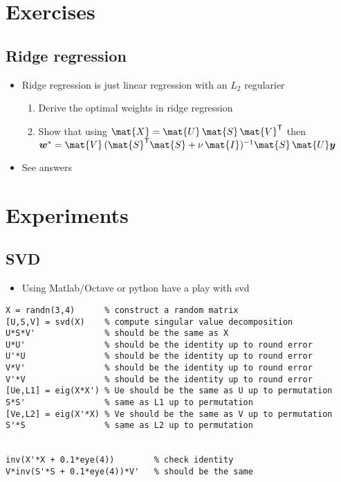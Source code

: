 \documentclass[11pt]{article}
\newcommand{\tr}{\textsf{T}}
\begin{document}
\section{Exercises}
\label{sec:org22787a9}

\subsection{Ridge regression}
\label{sec:org1ad7f4b}
\begin{itemize}
\item Ridge regression is just linear regression with an \(L_2\) regularier
\begin{enumerate}
\item Derive the optimal weights in ridge regression
\item Show that using \(\mat{X} = \mat{U}\,\mat{S}\,\mat{V}^\tr\) then
\(\bm{w}^* = \mat{V}\,(\mat{S}^\tr\mat{S} +
        \nu\,\mat{I})^{-1}\mat{S}\,\mat{U}\bm{y}\)
\end{enumerate}
\item See answers
\end{itemize}

\section{Experiments}
\label{sec:org82fd4ba}

\subsection{SVD}
\label{sec:org086fe6f}
\begin{itemize}
\item Using Matlab/Octave or python have a play with svd
\end{itemize}
\begin{verbatim}
X = randn(3,4)      % construct a random matrix
[U,S,V] = svd(X)    % compute singular value decomposition
U*S*V'              % should be the same as X
U*U'                % should be the identity up to round error
U'*U                % should be the identity up to round error
V*V'                % should be the identity up to round error
V'*V                % should be the identity up to round error
[Ue,L1] = eig(X*X') % Ue should be the same as U up to permutation
S*S'                % same as L1 up to permutation
[Ve,L2] = eig(X'*X) % Ve should be the same as V up to permutation
S'*S                % same as L2 up to permutation


inv(X'*X + 0.1*eye(4))        % check identity
V*inv(S'*S + 0.1*eye(4))*V'   % should be the same
\end{verbatim}
\end{document}
